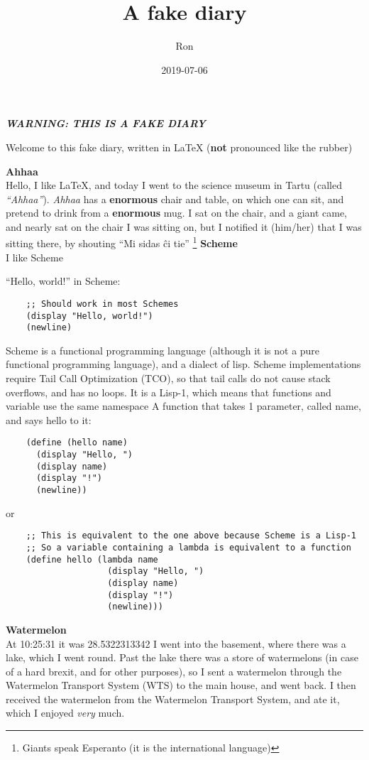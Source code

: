 \documentclass[UTF8]{tufte-book}
\title{A fake diary}
\author{Ron}
\date{2019-07-06}
\newcommand{\warning}[1]{\textbf{\textit{WARNING: #1}}}
\newcommand{\called}[1]{called \textit{#1}}
\newcommand{\wts}{WTS\texttrademark}
\newcommand{\WTS}{Watermelon Transport System\texttrademark}
\newenvironment{entry}[2] %
{\noindent\textbf{#2}\marginnote{#1}\\}{\vspace{0.5cm}}
\begin{document}
\frontmatter
\maketitle
\doclicenseThis
\newpage
\warning{THIS IS A FAKE DIARY}

Welcome to this fake diary, written in \LaTeX{} (\textbf{not} pronounced like the rubber)

\begin{entry}{2020-07-06}{Ahhaa}
  Hello, I like \LaTeX, and today I went to the science museum in Tartu (\called{``Ahhaa''}).
  \textit{Ahhaa} has a \textbf{enormous} chair and table, on which one can sit, and pretend to drink from a \textbf{enormous} mug.
  I sat on the chair, and a giant came, and nearly sat on the chair I was sitting on,
  but I notified it (him/her) that I was sitting there,
  by shouting ``Mi sidas \^ci tie'' \footnote{Giants speak Esperanto (it is the international language)}\newline
\end{entry}
\begin{entry}{2020-07-07}{Scheme}
  I like Scheme
  
  ``Hello, world!'' in Scheme:
  \begin{verbatim}
    ;; Should work in most Schemes
    (display "Hello, world!")
    (newline)
  \end{verbatim}
  Scheme is a functional programming language (although it is not a pure functional programming language), and a dialect of lisp.
  Scheme implementations require Tail Call Optimization (TCO), so that tail calls do not cause stack overflows, and has no loops.
  It is a Lisp-1, which means that functions and variable use the same namespace\newline
  A function that takes 1 parameter, called name, and says hello to it:
  \begin{verbatim}
    (define (hello name)
      (display "Hello, ")
      (display name)
      (display "!")
      (newline))
  \end{verbatim}
  or
  \begin{verbatim}
    ;; This is equivalent to the one above because Scheme is a Lisp-1
    ;; So a variable containing a lambda is equivalent to a function
    (define hello (lambda name
                    (display "Hello, ")
                    (display name)
                    (display "!")
                    (newline)))
  \end{verbatim}
\end{entry}
\begin{entry}{2020-07-08}{Watermelon}
  At 10:25:31 it was 28.5322313342\celsius\newline
  I went into the basement, where there was a lake, which I went round.
  Past the lake there was a store of watermelons (in case of a hard brexit, and for other purposes),
  so I sent a watermelon through the \WTS{} (\wts) to the main house, and went back.
  I then received the watermelon from the \WTS, and ate it, which I enjoyed \textit{very} much.\newline
\end{entry}
\end{document}
